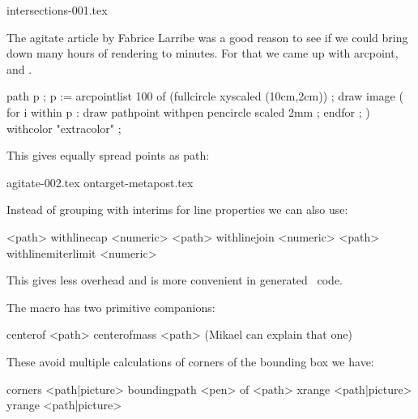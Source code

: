 \starttyping
intersections-001.tex
\stoptyping

\stoptitle

\starttitle[title=Arcs]

The agitate article by Fabrice Larribe was a good reason to see if we could bring
down many hours of rendering to minutes. For that we came up with \type
{arcpoint},  and .

\startbuffer
path p ; p := arcpointlist 100 of (fullcircle xyscaled (10cm,2cm)) ;
draw image ( for i within p :
   draw pathpoint withpen pencircle scaled 2mm ;
endfor ; ) withcolor "extracolor" ;
\stopbuffer

\typebuffer

This gives equally spread points as path:

\startlinecorrection
\processMPbuffer
\stoplinecorrection

\starttyping
agitate-002.tex
ontarget-metapost.tex
\stoptyping

\stoptitle

\starttitle[title=Drawing features]

Instead of grouping with interims for line properties we can also use:

\starttyping
<path> withlinecap <numeric>
<path> withlinejoin <numeric>
<path> withlinemiterlimit <numeric>
\stoptyping

This gives less overhead and is more convenient in generated \METAPOST\ code.

\stoptitle

\starttitle[title=Paths]
The macro  has two primitive companions:

\starttyping
centerof <path>
centerofmass <path> (Mikael can explain that one)
\stoptyping

These avoid multiple calculations of corners of the bounding box we have:

\starttyping
corners <path|picture>
boundingpath <pen> of <path>
xrange <path|picture>
yrange <path|picture>
\stoptyping


